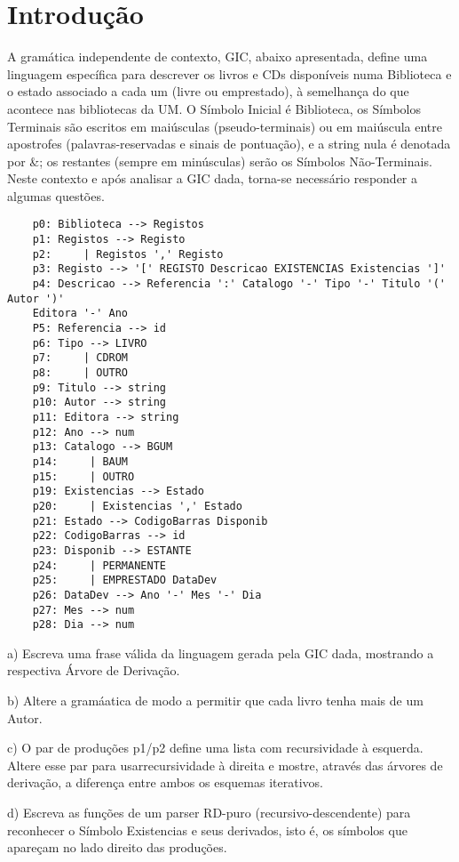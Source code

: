 \section{Introdução}

A gramática independente de contexto, GIC, abaixo apresentada, define uma linguagem específica para descrever os livros e CDs disponíveis numa Biblioteca e o estado associado a cada um (livre ou emprestado), à semelhança do que acontece nas bibliotecas da UM.
O Símbolo Inicial é Biblioteca, os Símbolos Terminais são escritos em maiúsculas (pseudo-terminais) ou em maiúscula entre apostrofes (palavras-reservadas e sinais de pontuação), e a string nula é denotada por &; os restantes (sempre em minúsculas) serão os Símbolos Não-Terminais.
Neste contexto e após analisar a GIC dada, torna-se necessário responder a algumas questões. 
\begin{verbatim}
    p0: Biblioteca --> Registos
    p1: Registos --> Registo
    p2:     | Registos ',' Registo
    p3: Registo --> '[' REGISTO Descricao EXISTENCIAS Existencias ']'
    p4: Descricao --> Referencia ':' Catalogo '-' Tipo '-' Titulo '(' Autor ')'
    Editora '-' Ano
    P5: Referencia --> id
    p6: Tipo --> LIVRO
    p7:     | CDROM
    p8:     | OUTRO
    p9: Titulo --> string
    p10: Autor --> string
    p11: Editora --> string
    p12: Ano --> num
    p13: Catalogo --> BGUM
    p14:     | BAUM
    p15:     | OUTRO
    p19: Existencias --> Estado
    p20:     | Existencias ',' Estado
    p21: Estado --> CodigoBarras Disponib
    p22: CodigoBarras --> id
    p23: Disponib --> ESTANTE
    p24:     | PERMANENTE
    p25:     | EMPRESTADO DataDev
    p26: DataDev --> Ano '-' Mes '-' Dia
    p27: Mes --> num
    p28: Dia --> num

\end{verbatim}
    

a) Escreva uma frase válida da linguagem gerada pela GIC dada, mostrando a respectiva Árvore de Derivação.

b) Altere a gramáatica de modo a permitir que cada livro tenha mais de um Autor.

c) O par de produções p1/p2 define uma lista com recursividade à esquerda. Altere esse par para usarrecursividade à direita e mostre, através das árvores de derivação, a diferença entre ambos os esquemas iterativos.

d) Escreva as funções de um parser RD-puro (recursivo-descendente) para reconhecer o Símbolo Existencias e seus derivados, isto é, os símbolos que apareçam no lado direito das produções.

